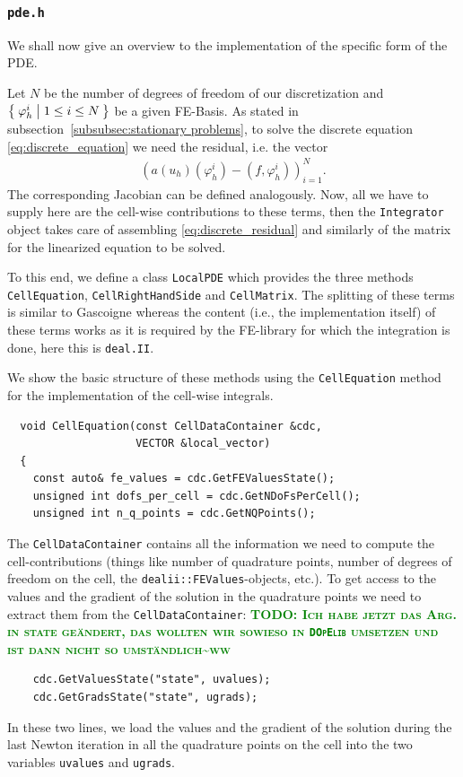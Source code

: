\documentclass[smallextended]{svjour3}       %
\numberwithin{equation}{section}
\renewcommand{\phi}{\varphi}
\newcommand{\deal}{\texttt{deal.II}}
\newcommand{\dope}{\texttt{DOpElib}}
\newcommand{\todoww}[1]{\textbf{\textsc{\textcolor{green}{TODO: #1\textasciitilde ww}}}}
\begin{document}
\subsubsection{\texttt{pde.h}}
We shall now give an overview to the implementation of the specific form of the PDE. 

Let $N$ be the number of degrees of freedom of our discretization and $\Set{\phi_{h}^{i}|1\leq i \leq N}$ be a given FE-Basis. As stated in subsection~\ref{subsubsec:stationary problems}, to solve the discrete equation \eqref{eq:discrete_equation} we need the residual, i.e. the vector
\begin{align}\label{eq:discrete_residual}
\left(a(u_h)(\phi_{h}^{i})-(f,\phi_{h}^{i})\right)_{i=1}^N.
\end{align}
The corresponding Jacobian can be defined analogously.
Now, all we have to supply here are the cell-wise contributions to these terms,
then the \texttt{Integrator} object 
takes care of assembling \eqref{eq:discrete_residual}
and similarly of the matrix for the linearized equation to be solved.

To this end, we define a class \texttt{LocalPDE} which provides the three methods
\texttt{CellEquation}, \texttt{CellRightHandSide} and \texttt{CellMatrix}. 
The splitting of these terms is similar to Gascoigne
\cite{gascoigne} whereas the content (i.e., the 
implementation itself) of these
terms works as it is required by the FE-library for which the integration is done, here this is \deal{}.


We show the basic structure of these methods using the \texttt{CellEquation} 
method for the implementation of the cell-wise integrals.

\begin{lstlisting}
  void CellEquation(const CellDataContainer &cdc,
                    VECTOR &local_vector)
  {
    const auto& fe_values = cdc.GetFEValuesState();
    unsigned int dofs_per_cell = cdc.GetNDoFsPerCell();
    unsigned int n_q_points = cdc.GetNQPoints();
\end{lstlisting}
 The \texttt{CellDataContainer} contains all the information we need to compute the cell-contributions (things like number of quadrature points, number of degrees of freedom on the cell, the \texttt{dealii::FEValues}-objects, etc.).
To get access to the values and the gradient of the solution in the quadrature 
points we need to extract them from the \texttt{CellDataContainer}:
\todoww{Ich habe jetzt das Arg. in state ge\"andert, das wollten wir sowieso in 
\dope{} umsetzen und ist dann nicht so umst\"andlich}
  \begin{lstlisting}
    cdc.GetValuesState("state", uvalues);
    cdc.GetGradsState("state", ugrads);
 \end{lstlisting}
 In these two lines, we load the values and the gradient of the solution 
during the last Newton iteration in all the quadrature points on the cell 
into the two variables \texttt{uvalues} and \texttt{ugrads}.
\end{document}

